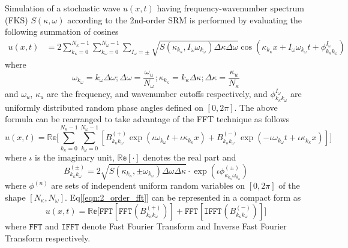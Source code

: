 \documentclass[preprint, review, 12pt]{elsarticle}
\begin{document}
Simulation of a stochastic wave $u(x, t)$ having frequency-wavenumber spectrum (FKS) $S(\kappa, \omega)$ according to the 2nd-order SRM is performed by evaluating the following summation of cosines \cite{Benowitz2015}
\begin{equation}
\begin{aligned}
	u(x, t) &= 2 \sum_{k_{\kappa}=0}^{N_{\kappa}-1}\sum_{k_{\omega}=0}^{N_{\omega}-1}\sum_{I_{\omega}=\pm} \sqrt{S(\kappa_{k_{\kappa}}, I_\omega \omega_{k_{\omega}})\Delta\kappa\Delta\omega}\cos(\kappa_{k_{\kappa}}x + I_\omega \omega_{k_{\omega}}t + \phi_{k_{\kappa}k_{\omega}}^{I_{\omega}}) 
\end{aligned}
\end{equation}
where
\begin{equation}
    \omega_{k_{\omega}} = k_{\omega}\Delta\omega; \Delta\omega = \frac{\omega_u}{N_{\omega}}; \kappa_{k_{\kappa}} = k_{\kappa}\Delta\kappa; \Delta\kappa = \frac{\kappa_{u}}{N_{\kappa}}
\end{equation}
and $\omega_u$, $\kappa_{u}$ are the frequency, and wavenumber cutoffs respectively, and $\phi_{k_{\kappa}k_{\omega}}^{I_{\omega}}$ are uniformly distributed random phase angles defined on $[0, 2\pi]$. The above formula can be rearranged to take advantage of the FFT technique as follows
\begin{equation}
    u(x, t) = \mathbb{Re} \Big[\sum_{k_{\kappa}=0}^{N_{\kappa} - 1} \sum_{k_{\omega}=0}^{N_\omega - 1} [B^{(+)}_{k_{\kappa}k_{\omega}}\exp(\iota \omega_{k_{\omega}} t + \iota \kappa_{k_{\kappa}} x) + B^{(-)}_{k_{\kappa}k_{\omega}}\exp(-\iota \omega_{k_{\omega}} t + \iota \kappa_{k_{\kappa}} x)]\Big]
\label{eqn:2_order_fft}
\end{equation}
where $\iota$ is the imaginary unit, $\mathbb{Re}[\cdot]$ denotes the real part and
\begin{equation}
    B^{(\pm)}_{k_{\kappa}k_{\omega}} = 2 \sqrt{S(\kappa_{k_\kappa}, \pm \omega_{k_\omega})\Delta \omega \Delta \kappa} \cdot \exp(\iota \phi_{\kappa_{k_\kappa}  \omega_{k_\omega}}^{(\pm)})
\end{equation}
where $\phi^{(n)}$ are sets of independent uniform random variables on $[0, 2\pi]$ of the shape $[N_\kappa, N_\omega]$. Eq[\ref{eqn:2_order_fft}] can be represented in a compact form as
\begin{equation}
    u(x, t) = \mathbb{Re} \Big[ \texttt{FFT}_{}[\texttt{FFT}_{}(B_{k_\kappa k_\omega }^{(+)})] + \texttt{FFT}_{}[\texttt{IFFT}_{}(B_{k_\kappa k_\omega }^{(-)})] \Big]
\end{equation}
where $\texttt{FFT}$ and $\texttt{IFFT}$ denote Fast Fourier Transform and Inverse Fast Fourier Transform respectively.
\end{document}
